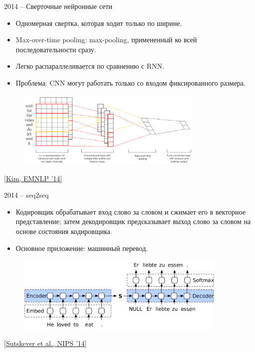\begin{frame}[c]{2014 -- Сверточные нейронные сети}
\begin{itemize}
	[square]
	\item Одномерная свертка, которая ходит только по ширине.
	\item Max-over-time pooling: max-pooling, примененный ко всей последовательности сразу.
	\item Легко распараллеливается по сравнению с RNN.
	\item Проблема: CNN могут работать только со входом фиксированного размера.
\end{itemize}
\begin{figure}
	\centering
	\includegraphics[width=0.8\textwidth]{figures/kim_emnlp2014.png}
\end{figure}
\let\thefootnote\footnote{\href{http://arxiv.org/abs/1408.5882}{\color[rgb]{0.5,0.5,0.5} [Kim, EMNLP ’14]}}
\end{frame}

\begin{frame}[c]{2014 -- seq2seq}
\begin{itemize}
	[square]
	\item Кодировщик обрабатывает вход слово за словом и сжимает его в векторное представление; затем декодировщик предсказывает выход слово за словом на основе состояния кодировщика.
	\item Основное приложение: машинный перевод.
\end{itemize}
\begin{figure}
	\centering
	\includegraphics[width=0.9\textwidth]{figures/qseq2seq.pdf}
\end{figure}
\let\thefootnote\footnote{\href{https://arxiv.org/abs/1409.3215}{\color[rgb]{0.5,0.5,0.5} [Sutskever et al., NIPS ’14]}}
\end{frame}

